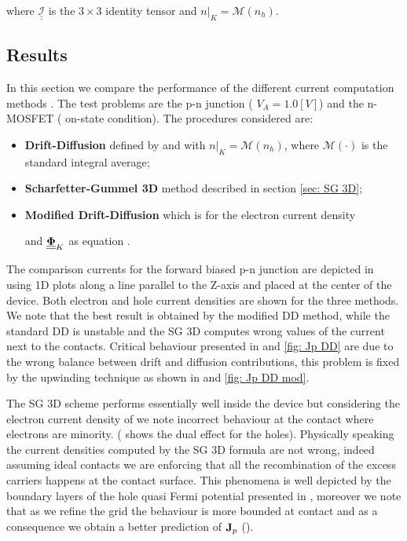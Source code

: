 where $\underline{\underline{\mathcal{I}}}$ is the $3\times 3$ identity tensor and $n|_K=\mathcal{M}(n_h)$.
\subsection{Results}

In this section we compare the performance of the different current computation methods . The test problems are the p-n junction (  $V_A=1.0[V]$) and the n-MOSFET ( on-state condition).
The procedures considered are:
\begin{itemize}
\item {\bf Drift-Diffusion} defined by  and  with $n|_K=\mathcal{M}(n_h)$, where $\mathcal{M}(\cdot)$ is the standard integral average;
\item {\bf Scharfetter-Gummel 3D} method described in section \ref{sec: SG 3D};
\item {\bf Modified Drift-Diffusion} which is for the electron current density 

 and $\underline{\underline{\mathbf{\Phi}}}_K$ as equation .
\end{itemize}

The comparison currents for the forward biased p-n junction are depicted in  using 1D plots along a line parallel to the Z-axis and placed at the center of the device. Both electron and hole current densities are shown for the three methods. 
We note that the best result is obtained by the modified DD method, while the standard DD is unstable and the SG 3D computes wrong values of the current next to the contacts. 
Critical behaviour presented in  and \ref{fig: Jp DD} are due to the wrong balance between drift and diffusion contributions, this problem is fixed by the upwinding technique as shown in  and \ref{fig: Jp DD mod}.

The SG 3D scheme performs essentially well inside the device but considering the electron current density of  we note incorrect behaviour at the contact where electrons are minority. ( shows the dual effect for the holes). Physically speaking the current densities computed by the SG 3D formula are not wrong, indeed assuming ideal contacts we are enforcing that all the recombination of the excess carriers happens at the contact surface. This phenomena is well depicted by the boundary layers of the hole quasi Fermi potential presented in , moreover we note that as we refine the grid the behaviour is more bounded at contact and as a consequence we obtain a better prediction of $\mathbf{J}_p$ ().

